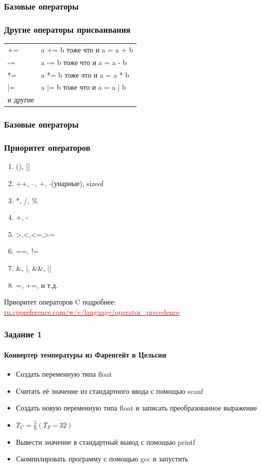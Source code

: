\documentclass[12pt,pdf,hyperref={unicode}]{beamer}
\begin{document}
\begin{frame}
\frametitle{Базовые операторы}
\frametitle{Другие операторы присваивания}
\begin{center}
\begin{tabular}{ l l}
  += & a += b тоже что и a = a + b  \\
  -= & a -= b тоже что и a = a - b  \\
  *= & a *= b тоже что и a = a * b  \\
  |= & a |= b тоже что и a = a | b  \\
  и другие
\end{tabular}
\end{center}
\end{frame}

\begin{frame}
\frametitle{Базовые операторы}
\frametitle{Приоритет операторов}
\begin{center}
\begin{enumerate}
\item (), []
\item ++, --, +, -(унарные), sizeof
\item *, /, \%
\item +, -
\item >,<,<=,>=
\item ==, !=
\item \&, |, \&\&, ||
\item =, +=, и т.д.
\end{enumerate}
\end{center}
Приоритет операторов C подробнее:\\
\href{http://ru.cppreference.com/w/c/language/operator_precedence}
{\textcolor{red}{ru.cppreference.com/w/c/language/operator\_precedence}}
\end{frame}

\fi


\begin{frame}
\frametitle{Задание 1} 
\framesubtitle{Конвертер температуры из Фаренгейт в Цельсии} 
\begin{center}
\begin{itemize}
\item Создать переменную типа float \\
\item Считать её значение из стандартного ввода с помощью scanf\\
\item Создать новую переменную типа float и записать преобразованное выражение \\
\item $T_C = \frac{5}{9}(T_F-32)$\\
\item Вывести значение в стандартный вывод с помощью printf\\
\item Скомпилировать программу с помощью gcc и запустить
\end{itemize}
\end{center}
\end{frame}
\end{document}
